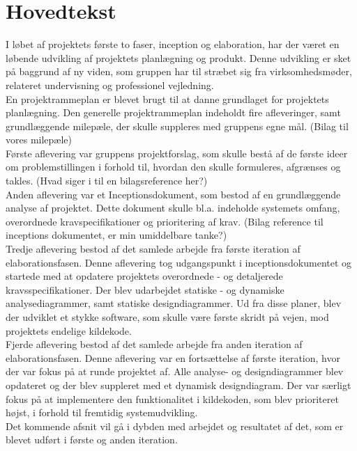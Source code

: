 \chapter{Hovedtekst}
I løbet af projektets første to faser, inception og elaboration, har der været en løbende udvikling af projektets planlægning og produkt. Denne udvikling er sket på baggrund af ny viden, som gruppen har til stræbet sig fra virksomhedsmøder, relateret undervisning og professionel vejledning. \\
En projektrammeplan er blevet brugt til at danne grundlaget for projektets planlægning. Den generelle projektrammeplan indeholdt fire afleveringer, samt grundlæggende milepæle, der skulle suppleres med gruppens egne mål. 
(Bilag til vores milepæle) \\
Første aflevering var gruppens projektforslag, som skulle bestå af de første ideer om problemstillingen i forhold til, hvordan den skulle formuleres, afgrænses og takles. (Hvad siger i til en bilagsreference her?)\\
Anden aflevering var et Inceptionsdokument, som bestod af en grundlæggende analyse af projektet. Dette dokument skulle bl.a. indeholde systemets omfang, overordnede kravspecifikationer og prioritering af krav. (Bilag reference til inceptions dokumentet, er min umiddelbare tanke?)\\
Tredje aflevering bestod af det samlede arbejde fra første iteration af elaborationsfasen. Denne aflevering tog udgangspunkt i inceptionsdokumentet og startede med at opdatere projektets overordnede - og detaljerede kravsspecifikationer. Der blev udarbejdet statiske - og dynamiske analysediagrammer, samt statiske designdiagrammer. Ud fra disse planer, blev der udviklet et stykke software, som skulle være første skridt på vejen, mod projektets endelige kildekode.\\
Fjerde aflevering bestod af det samlede arbejde fra anden iteration af elaborationsfasen. Denne aflevering var en fortsættelse af første iteration, hvor der var fokus på at runde projektet af. Alle analyse- og designdiagrammer blev opdateret og der blev suppleret med et dynamisk designdiagram. Der var særligt fokus på at implementere den funktionalitet i kildekoden, som blev prioriteret højst, i forhold til fremtidig systemudvikling.\\
Det kommende afsnit vil gå i dybden med arbejdet og resultatet af det, som er blevet udført i første og anden iteration.

